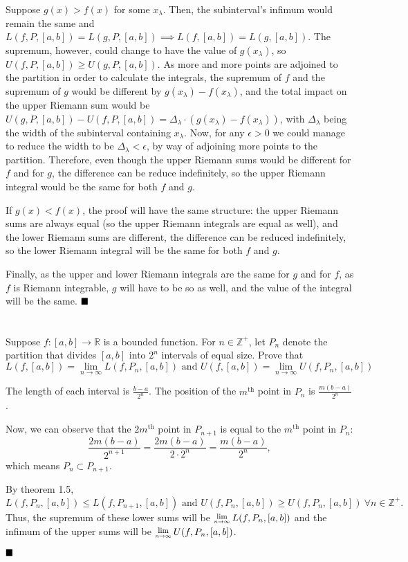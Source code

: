 \documentclass[11pt, a4paper, tikz]{article}
\newcommand{\centsection}[1]{
	\section*{\centering{#1}}
}
\renewcommand{\qed}{\hfill\blacksquare}
\newcommand{\Lim}[1]{\raisebox{0.5ex}{\scalebox{0.8}{$\displaystyle \lim_{#1}\;$}}}
\begin{document}
	Suppose $g(x) > f(x)$ for some $x_\lambda$. Then, the subinterval's infimum would remain the same and $L(f,P,[a,b]) = L(g,P,[a,b])\implies L(f,[a,b])=L(g,[a,b])$. The supremum, however, could change to have the value of $g(x_\lambda)$, so $U(f,P,[a,b]) \geq U(g,P,[a,b])$. As more and more points are adjoined to the partition in order to calculate the integrals, the supremum of $f$ and the supremum of $g$ would be different by $g(x_\lambda)-f(x_\lambda)$, and the total impact on the upper Riemann sum would be $U(g,P,[a,b])-U(f,P,[a,b]) = \Delta_\lambda\cdot(g(x_\lambda)-f(x_\lambda))$, with $\Delta_\lambda$ being the width of the subinterval containing $x_\lambda$. Now, for any $\epsilon>0$ we could manage to reduce the width to be $\Delta_\lambda<\epsilon$, by way of adjoining more points to the partition. Therefore, even though the upper Riemann sums would be different for $f$ and for $g$, the difference can be reduce indefinitely, so the upper Riemann integral would be the same for both $f$ and $g$.
	
	If $g(x) < f(x)$, the proof will have the same structure: the upper Riemann sums are always equal (so the upper Riemann integrals are equal as well), and the lower Riemann sums are different, the difference can be reduced indefinitely, so the lower Riemann integral will be the same for both $f$ and $g$.
	
	Finally, as the upper and lower Riemann integrals are the same for $g$ and for $f$, as $f$ is Riemann integrable, $g$ will have to be so as well, and the value of the integral will be the same.
	$\qed$
	
	\centsection{Exercise 7}
	
	\begin{formulationBox}
		Suppose $f:[a,b]\rightarrow\mathbb{R}$ is a bounded function. For $n\in\mathbb{Z}^+$, let $P_n$ denote the partition that divides $[a,b]$ into $2^n$ intervals of equal size. Prove that \[L(f,[a,b]) = \lim_{n\rightarrow\infty}L(f,P_n,[a,b]) \textrm{ and } U(f,[a,b]) = \lim_{n\rightarrow\infty}U(f,P_n,[a,b])\]
	\end{formulationBox}
	
	The length of each interval is $\frac{b-a}{2^n}$. The position of the $m^\textrm{th}$ point in $P_n$ is $\frac{m(b-a)}{2^n}$.
	
	Now, we can observe that the $2m^\textrm{th}$ point in $P_{n+1}$ is equal to the $m^\textrm{th}$ point in $P_n$: \[\frac{2m(b-a)}{2^{n+1}} = \frac{2m(b-a)}{2\cdot2^n} = \frac{m(b-a)}{2^n},\] which means $P_n \subset P_{n+1}$.
	
	By theorem 1.5, \[L(f,P_n,[a,b]) \leq L(f,P_{n+1},[a,b]) \textrm{ and } U(f,P_n,[a,b]) \geq U(f,P_n,[a,b])\ \forall n\in\mathbb{Z}^+.\] Thus, the supremum of these lower sums will be $\Lim{n\rightarrow\infty}L(f,P_n,[a,b])$ and the infimum of the upper sums will be $\Lim{n\rightarrow\infty}U(f,P_n,[a,b])$.
	
	$\qed$
	
\end{document}
